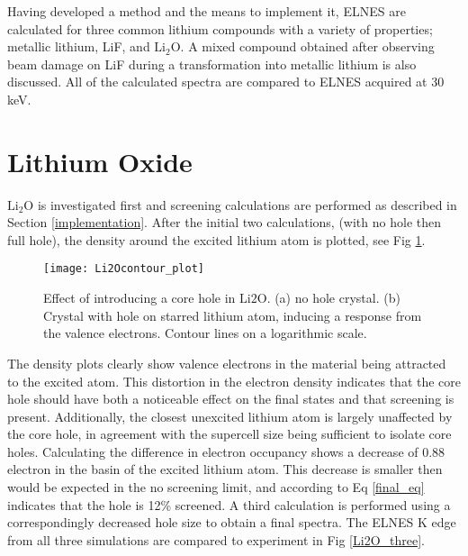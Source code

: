 
Having developed a method and the means to implement it, ELNES are calculated for three common lithium compounds with a variety of properties; metallic lithium, LiF, and  $\mathrm{Li_2O}$.  A mixed compound obtained after observing beam damage on LiF during a transformation into metallic lithium is also discussed.  All of the calculated spectra are compared to ELNES acquired at 30 keV.  




\section{Lithium Oxide}

 $ \mathrm{Li_2O} $ is investigated first and screening calculations are performed as described in Section \ref{implementation}.   After the initial two calculations, (with no hole then full hole), the density around the excited lithium atom is plotted, see Fig \ref{Li2O_contour}.  \\

\begin{figure}
	\centering
	\texttt{[image: Li2Ocontour\_plot]}
	\caption{Effect of introducing a core hole in $ \mathrm{Li2O} $.  (a) no hole crystal.  (b) Crystal with hole on starred lithium atom, inducing a response from the valence electrons.  Contour lines on a logarithmic scale. }
	\label{Li2O_contour}
\end{figure}

The density plots clearly show valence electrons in the material being attracted to the excited atom. This distortion in the electron density indicates that the core hole should have both a noticeable effect on the final states and that screening is present.  Additionally, the closest unexcited lithium atom is largely unaffected by the core hole, in agreement with the supercell size being sufficient to isolate core holes.  Calculating the difference in electron occupancy shows a decrease of 0.88 electron in the basin of the excited lithium atom.  This decrease is smaller then would be expected in the no screening limit, and according to Eq \ref{final_eq} indicates that the hole is 12\% screened.  A third calculation is performed using a correspondingly decreased hole size to obtain a final spectra.  The ELNES K edge from all three simulations are compared to experiment in Fig \ref{Li2O_three}.  \\

